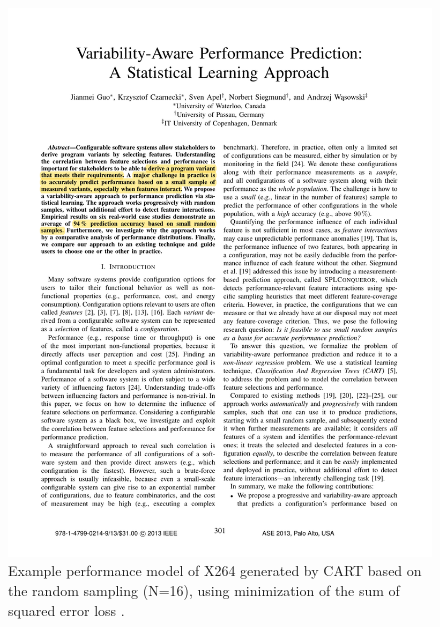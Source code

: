 \begin{figure}[h]
	\centering
	\includegraphics[page=4,clip,trim=3.5cm 18cm 3.5cm 1.5cm, width=\linewidth]
	{Paper/VariabilityAwarePerformancePredictionAStatisticalLearningApproach.pdf}
	\caption{Example performance model of X264 generated by CART based on the random sampling (N=16), using minimization of the sum of squared error loss \cite{VariabilityAwarePerformancePredictionJianmeiSigmundApel}.}	
	\label{fig:VAPPExampleTree}	
\end{figure}
\FloatBarrier %
